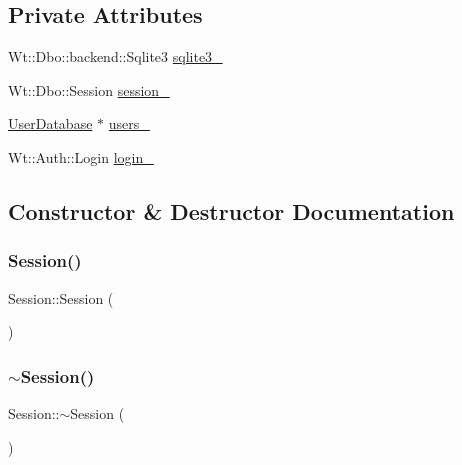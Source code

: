 \subsection*{Private Attributes}
\begin{DoxyCompactItemize}
\item 
Wt\+::\+Dbo\+::backend\+::\+Sqlite3 \hyperlink{class_session_a15a7b5a56a15bff8eed8cf98c87abcd3}{sqlite3\+\_\+}
\item 
Wt\+::\+Dbo\+::\+Session \hyperlink{class_session_a7de9be5226d297784ae26a79a1267ac2}{session\+\_\+}
\item 
\hyperlink{_session_8h_a34c01062ebe1a5567ef968ff473f0354}{User\+Database} $\ast$ \hyperlink{class_session_a791c538e6bb5214c72b974329c419274}{users\+\_\+}
\item 
Wt\+::\+Auth\+::\+Login \hyperlink{class_session_a71e5966d537785ddec69daeb7f203dd5}{login\+\_\+}
\end{DoxyCompactItemize}


\subsection{Constructor \& Destructor Documentation}
\mbox{\label{class_session_ad92ef09b872c9227e38a6efdd4d8a837}} 
\subsubsection{\texorpdfstring{Session()}{Session()}}
{\footnotesize\ttfamily Session\+::\+Session (\begin{DoxyParamCaption}{ }\end{DoxyParamCaption})}

\mbox{\label{class_session_a8753bb9dee966b7d39abc9b7237cd665}} 
\subsubsection{\texorpdfstring{$\sim$\+Session()}{~Session()}}
{\footnotesize\ttfamily Session\+::$\sim$\+Session (\begin{DoxyParamCaption}{ }\end{DoxyParamCaption})}



